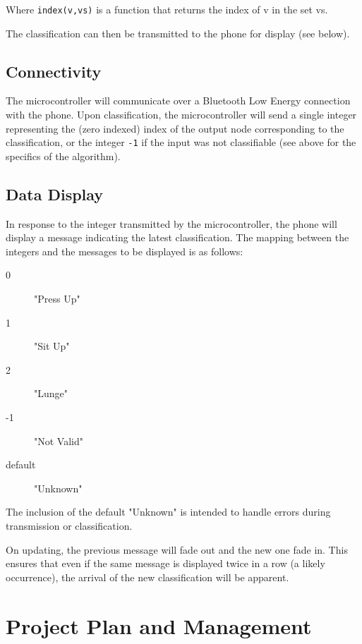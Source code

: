 \documentclass[a4paper]{article}
\begin{document}
Where \lstinline{index(v,vs)} is a function that returns the index of v in the set vs.


The classification can then be transmitted to the phone for display (see below).

\subsection{Connectivity}%

The microcontroller will communicate over a Bluetooth Low Energy connection with the phone. Upon classification, the microcontroller will send a single integer representing the (zero indexed) index of the output node corresponding to the classification, or the integer \lstinline{-1} if the input was not classifiable (see above for the specifics of the algorithm).

\subsection{Data Display}%

In response to the integer transmitted by the microcontroller, the phone will display a message indicating the latest classification. The mapping between the integers and the messages to be displayed is as follows:
\begin{description}
\item[0] "Press Up"
\item[1] "Sit Up"
\item[2] "Lunge"
\item[-1] "Not Valid"
\item[default] "Unknown"
\end{description}

The inclusion of the default "Unknown" is intended to handle errors during transmission or classification.

On updating, the previous message will fade out and the new one fade in. This ensures that even if the same message is displayed twice in a row (a likely occurrence), the arrival of the new classification will be apparent.

\newpage
\section{Project Plan and Management}
\end{document}
